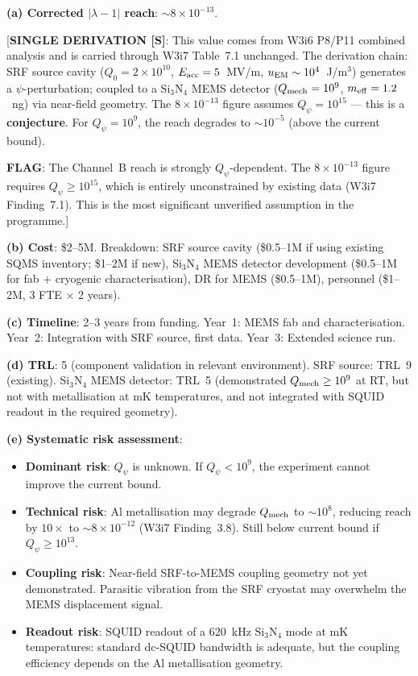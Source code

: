 \documentclass[11pt]{article}
\newcommand{\lam}{\lambda}
\newcommand{\ee}[1]{\times 10^{#1}}
\newcommand{\Qpsi}{Q_\psi}
\newcommand{\Qmech}{Q_{\rm mech}}
\newcommand{\lbone}{|\lam - 1|}
\theoremstyle{definition}
\theoremstyle{remark}
\begin{document}
\begin{tcolorbox}[colback=green!5!white, colframe=green!60!black,
  title=\textbf{RANK \#3: CHANNEL~B (P11+P2 JOINT) --- NOW HIGHEST-PRIORITY
  BOUND-IMPROVING EXPERIMENT}]

\textbf{(a) Corrected $\lbone$ reach}: $\sim 8\ee{-13}$.

[\textbf{SINGLE DERIVATION [S]}: This value comes from W3i6
P8/P11 combined analysis and is carried through W3i7 Table~7.1
unchanged. The derivation chain: SRF source cavity
($Q_0 = 2\ee{10}$, $E_{\rm acc} = 5$~MV/m, $u_{\rm EM} \sim 10^4$~J/m$^3$)
generates a $\psi$-perturbation; coupled to a Si$_3$N$_4$ MEMS detector
($\Qmech = 10^9$, $m_{\rm eff} = 1.2$~ng) via near-field geometry.
The $8\ee{-13}$ figure assumes $\Qpsi = 10^{15}$ --- this is a
\textbf{conjecture}. For $\Qpsi = 10^9$, the reach degrades to
$\sim 10^{-5}$ (above the current bound).

\textbf{FLAG}: The Channel~B reach is strongly $\Qpsi$-dependent.
The $8\ee{-13}$ figure requires $\Qpsi \geq 10^{15}$, which is entirely
unconstrained by existing data (W3i7 Finding~7.1). This is the most
significant unverified assumption in the programme.]

\textbf{(b) Cost}: \$2--5M. Breakdown: SRF source cavity (\$0.5--1M
if using existing SQMS inventory; \$1--2M if new), Si$_3$N$_4$ MEMS
detector development (\$0.5--1M for fab + cryogenic characterisation),
DR for MEMS (\$0.5--1M), personnel (\$1--2M, 3 FTE $\times$ 2 years).

\textbf{(c) Timeline}: 2--3 years from funding. Year~1: MEMS fab and
characterisation. Year~2: Integration with SRF source, first data.
Year~3: Extended science run.

\textbf{(d) TRL}: 5 (component validation in relevant environment).
SRF source: TRL~9 (existing). Si$_3$N$_4$ MEMS detector: TRL~5
(demonstrated $\Qmech \geq 10^9$ at RT, but not with metallisation at
mK temperatures, and not integrated with SQUID readout in the required
geometry).

\textbf{(e) Systematic risk assessment}:
\begin{itemize}[nosep]
\item \textbf{Dominant risk}: $\Qpsi$ is unknown. If $\Qpsi < 10^{9}$,
  the experiment cannot improve the current bound.
\item \textbf{Technical risk}: Al metallisation may degrade $\Qmech$
  to $\sim 10^8$, reducing reach by $10\times$ to $\sim 8\ee{-12}$
  (W3i7 Finding~3.8). Still below current bound if $\Qpsi \geq 10^{13}$.
\item \textbf{Coupling risk}: Near-field SRF-to-MEMS coupling geometry
  not yet demonstrated. Parasitic vibration from the SRF cryostat may
  overwhelm the MEMS displacement signal.
\item \textbf{Readout risk}: SQUID readout of a 620~kHz Si$_3$N$_4$
  mode at mK temperatures: standard dc-SQUID bandwidth is adequate, but
  the coupling efficiency depends on the Al metallisation geometry.
\end{itemize}


\end{tcolorbox}
\end{document}

